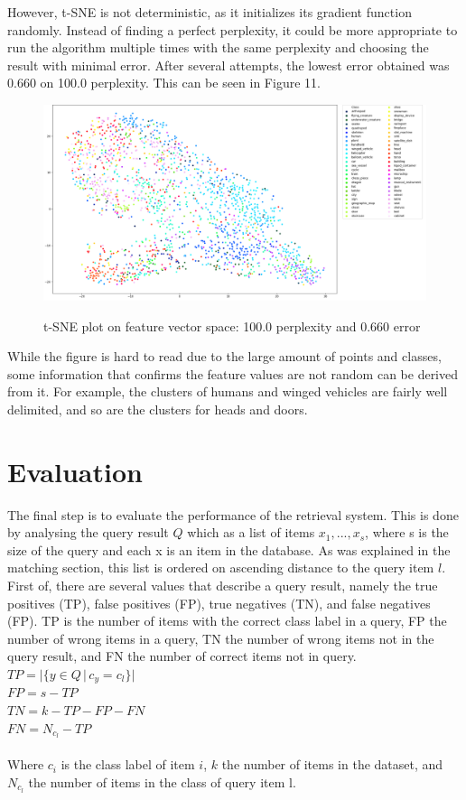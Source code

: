 \documentclass{bigdata}
\begin{document}
However, t-SNE is not deterministic, as it initializes its gradient function randomly. Instead of finding a perfect perplexity, it could be more appropriate to run the algorithm multiple times with the same perplexity and choosing the result with minimal error. After several attempts, the lowest error obtained was 0.660 on 100.0 perplexity. This can be seen in Figure 11. \\
\begin{figure}[!h]
	\includegraphics[width=1\linewidth]{Pictures/perp100err0-660.png}
	\label{fig:fig1}
	\caption{t-SNE plot on feature vector space: 100.0 perplexity and 0.660 error}
\end{figure}

While the figure is hard to read due to the large amount of points and classes, some information that confirms the feature values are not random can be derived from it. For example, the clusters of humans and winged vehicles are fairly well delimited, and so are the clusters for heads and doors.

\section{Evaluation}
The final step is to evaluate the performance of the retrieval system. This is done by analysing the query result $Q$ which as a list of items ${x_1,...,x_s}$, where s is the size of the query and each x is an item in the database. As was explained in the matching section, this list is ordered on ascending distance to the query item $l$. First of, there are several values that describe a query result, namely the true positives (TP), false positives (FP), true negatives (TN), and false negatives (FP). TP is the number of items with the correct class label in a query, FP the number of wrong items in a query, TN the number of wrong items not in the query result, and FN the number of correct items not in query.
\\ 
$TP = |\{y \in Q\, |\, c_y = c_l\}|$\\
$FP = s - TP$\\
$TN = k - TP - FP - FN$\\
$FN = N_{c_l} - TP$\\
\\
Where $c_i$ is the class label of item $i$, $k$ the number of items in the dataset, and $N_{c_l}$ the number of items in the class of query item l.  
\end{document}
